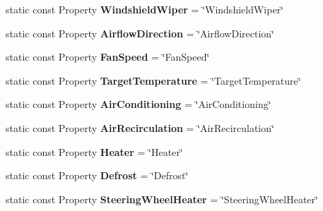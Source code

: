 \begin{DoxyCompactItemize}
\item 
\hypertarget{classVehicleProperty_afe911cbe3c105b89c0f5b9f0163698c8}{static const Property {\bfseries Windshield\-Wiper} = \char`\"{}Windshield\-Wiper\char`\"{}}\label{classVehicleProperty_afe911cbe3c105b89c0f5b9f0163698c8}

\item 
\hypertarget{classVehicleProperty_adeeec47dbbcc60ee78b30c8c1a917836}{static const Property {\bfseries Airflow\-Direction} = \char`\"{}Airflow\-Direction\char`\"{}}\label{classVehicleProperty_adeeec47dbbcc60ee78b30c8c1a917836}

\item 
\hypertarget{classVehicleProperty_afd2a544499ec8ddc83127ef268f9e5e5}{static const Property {\bfseries Fan\-Speed} = \char`\"{}Fan\-Speed\char`\"{}}\label{classVehicleProperty_afd2a544499ec8ddc83127ef268f9e5e5}

\item 
\hypertarget{classVehicleProperty_a14d5cc6734fa65eb1e352d9ddbe05c17}{static const Property {\bfseries Target\-Temperature} = \char`\"{}Target\-Temperature\char`\"{}}\label{classVehicleProperty_a14d5cc6734fa65eb1e352d9ddbe05c17}

\item 
\hypertarget{classVehicleProperty_a45738d294fe38c6fa5f198c30b17153c}{static const Property {\bfseries Air\-Conditioning} = \char`\"{}Air\-Conditioning\char`\"{}}\label{classVehicleProperty_a45738d294fe38c6fa5f198c30b17153c}

\item 
\hypertarget{classVehicleProperty_aa5c99592d51aa0a05eb277563c2273d7}{static const Property {\bfseries Air\-Recirculation} = \char`\"{}Air\-Recirculation\char`\"{}}\label{classVehicleProperty_aa5c99592d51aa0a05eb277563c2273d7}

\item 
\hypertarget{classVehicleProperty_ad5a3fdf51333943c486fa216e894cb29}{static const Property {\bfseries Heater} = \char`\"{}Heater\char`\"{}}\label{classVehicleProperty_ad5a3fdf51333943c486fa216e894cb29}

\item 
\hypertarget{classVehicleProperty_a1f1ade6fb94a977e8dbc31b3a90b1cc3}{static const Property {\bfseries Defrost} = \char`\"{}Defrost\char`\"{}}\label{classVehicleProperty_a1f1ade6fb94a977e8dbc31b3a90b1cc3}

\item 
\hypertarget{classVehicleProperty_a50ba22b48049e141acfd9c24549573c2}{static const Property {\bfseries Steering\-Wheel\-Heater} = \char`\"{}Steering\-Wheel\-Heater\char`\"{}}\label{classVehicleProperty_a50ba22b48049e141acfd9c24549573c2}


\end{DoxyCompactItemize}
